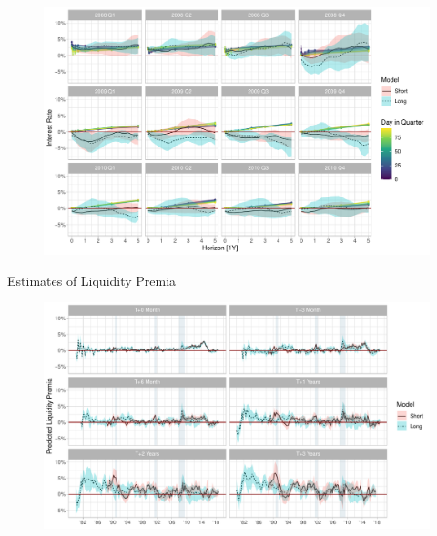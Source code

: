 \documentclass[10pt,aspectratio=169]{beamer}
\begin{document}
\begin{frame}{}
    \begin{figure}\centering 
    \begin{minipage}{0.9\textwidth}\centering
        \includegraphics[width=\textwidth]{yield_prediction_plot.pdf}
    \end{minipage}
    \end{figure}
    
\end{frame}


\begin{frame}{Estimates of Liquidity Premia}
    \begin{figure}\centering 
        \begin{minipage}{0.87\textwidth}\centering
        \includegraphics[width=\textwidth]{estimates_of_liquidity_premia_plot.pdf}
        \end{minipage}
    \end{figure}
\end{frame}
\end{document}
